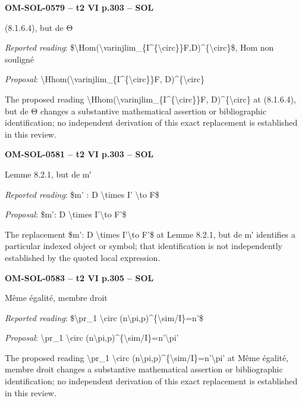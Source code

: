 \par\noindent\textbf{OM-SOL-0579 -- t2 VI p.303 -- SOL}\par
(8.1.6.4), but de Θ\par
\emph{Reported reading}: \$\textbackslash{}Hom(\textbackslash{}varinjlim\_\{I\textasciicircum{}\{\textbackslash{}circ\}\}F,D)\textasciicircum{}\{\textbackslash{}circ\}\$, Hom non souligné\par
\emph{Proposal}: \textbackslash{}Hhom(\textbackslash{}varinjlim\_\{I\textasciicircum{}\{\textbackslash{}circ\}\}F, D)\textasciicircum{}\{\textbackslash{}circ\}\par
The proposed reading \textbackslash{}Hhom(\textbackslash{}varinjlim\_\{I\textasciicircum{}\{\textbackslash{}circ\}\}F, D)\textasciicircum{}\{\textbackslash{}circ\} at (8.1.6.4), but de Θ changes a substantive mathematical assertion or bibliographic identification; no independent derivation of this exact replacement is established in this review.\par
\par\noindent\textbf{OM-SOL-0581 -- t2 VI p.303 -- SOL}\par
Lemme 8.2.1, but de m′\par
\emph{Reported reading}: \$m' : D \textbackslash{}times I' \textbackslash{}to F\$\par
\emph{Proposal}: \$m': D \textbackslash{}times I'\textbackslash{}to F'\$\par
The replacement \$m': D \textbackslash{}times I'\textbackslash{}to F'\$ at Lemme 8.2.1, but de m′ identifies a particular indexed object or symbol; that identification is not independently established by the quoted local expression.\par
\par\noindent\textbf{OM-SOL-0583 -- t2 VI p.305 -- SOL}\par
Même égalité, membre droit\par
\emph{Reported reading}: \$\textbackslash{}pr\_1 \textbackslash{}circ (n\textbackslash{}pi,p)\textasciicircum{}\{\textbackslash{}sim/I\}=\allowbreak n'\$\par
\emph{Proposal}: \textbackslash{}pr\_1 \textbackslash{}circ (n\textbackslash{}pi,p)\textasciicircum{}\{\textbackslash{}sim/I\}=\allowbreak n'\textbackslash{}pi'\par
The proposed reading \textbackslash{}pr\_1 \textbackslash{}circ (n\textbackslash{}pi,p)\textasciicircum{}\{\textbackslash{}sim/I\}=\allowbreak n'\textbackslash{}pi' at Même égalité, membre droit changes a substantive mathematical assertion or bibliographic identification; no independent derivation of this exact replacement is established in this review.\par
